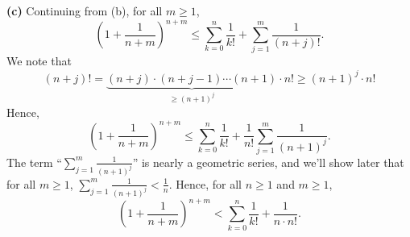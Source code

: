  \textbf{(c)} Continuing from (b), for all $m\ge 1$,
\begin{equation}
\left( 1 + \frac{1}{n+m} \right)^{n+m} \le \sum_{k=0}^{n} \frac{1}{k!} + \sum_{j=1}^{m} \frac{1}{(n+j)!} .
\end{equation}
We note that 
$$ (n+j)! = \underbrace{(n+j) \cdot (n+j-1) \cdots (n+1)}_{\ge (n+1)^j} \cdot n! \ge (n+1)^j  \cdot n! $$
Hence, 
\begin{equation}
\left( 1 + \frac{1}{n+m} \right)^{n+m} \le \sum_{k=0}^{n} \frac{1}{k!} + \frac{1}{n!}\sum_{j=1}^{m} \frac{1}{(n+1)^j}. 
\end{equation}
The term ``$\sum_{j=1}^{m} \frac{1}{(n+1)^j}$'' is nearly a geometric series, and we'll show later that for all $m \ge 1$,  $\sum_{j=1}^{m} \frac{1}{(n+1)^j} < \frac{1}{n}$.
Hence, for  all $n \geq 1$ and $m \geq 1$, 
\begin{equation}
\label{eqn:bernoulliBOunds}
\left( 1 + \frac{1}{n+m} \right)^{n+m} < \sum_{k=0}^{n} \frac{1}{k!} + \frac{1}{n \cdot n!}.
\end{equation}

\Qed
    

